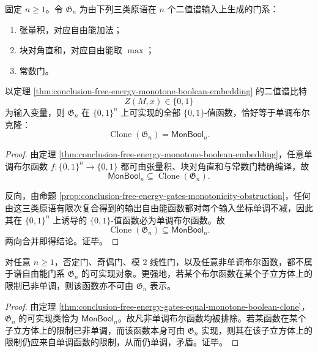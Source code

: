 \begin{theorem}\label{thm:conclusion-free-energy-gates-equal-monotone-boolean-clone}
固定 \(n\ge 1\)。令 \(\mathfrak G_n\) 为由下列三类原语在 \(n\) 个二值谱输入上生成的门系：
\begin{enumerate}
  \item 张量积，对应自由能加法；
  \item 块对角直和，对应自由能取 \(\max\)；
  \item 常数门。
\end{enumerate}
以定理 \ref{thm:conclusion-free-energy-monotone-boolean-embedding} 的二值谱比特
\[
Z(M,x)\in\{0,1\}
\]
为输入变量，则 \(\mathfrak G_n\) 在 \(\{0,1\}^n\) 上可实现的全部 \(\{0,1\}\)-值函数，恰好等于单调布尔克隆：
\[
\operatorname{Clone}(\mathfrak G_n)=\mathsf{MonBool}_n.
\]
\end{theorem}
\begin{proof}
由定理 \ref{thm:conclusion-free-energy-monotone-boolean-embedding}，任意单调布尔函数
\(
f:\{0,1\}^n\to\{0,1\}
\)
都可由张量积、块对角直和与常数门精确编译，故
\[
\mathsf{MonBool}_n\subseteq \operatorname{Clone}(\mathfrak G_n).
\]

反向，由命题 \ref{prop:conclusion-free-energy-gates-monotonicity-obstruction}，任何由这三类原语有限次复合得到的输出自由能函数都对每个输入坐标单调不减，因此其在 \(\{0,1\}^n\) 上诱导的 \(\{0,1\}\)-值函数必为单调布尔函数。故
\[
\operatorname{Clone}(\mathfrak G_n)\subseteq \mathsf{MonBool}_n.
\]
两向合并即得结论。证毕。
\end{proof}

\begin{corollary}[非单调逻辑的绝对不可编译性]\label{cor:conclusion-free-energy-nonmonotone-absolute-uncompilability}
对任意 \(n\ge 1\)，否定门、奇偶门、模 \(2\) 线性门，以及任意非单调布尔函数，都不属于谱自由能门系 \(\mathfrak G_n\) 的可实现对象。更强地，若某个布尔函数在某个子立方体上的限制已非单调，则该函数亦不可由 \(\mathfrak G_n\) 表示。
\end{corollary}
\begin{proof}
由定理 \ref{thm:conclusion-free-energy-gates-equal-monotone-boolean-clone}，\(\mathfrak G_n\) 的可实现类恰为 \(\mathsf{MonBool}_n\)。故凡非单调布尔函数均被排除。若某函数在某个子立方体上的限制已非单调，而该函数本身可由 \(\mathfrak G_n\) 实现，则其在该子立方体上的限制仍应来自单调函数的限制，从而仍单调，矛盾。证毕。
\end{proof}


